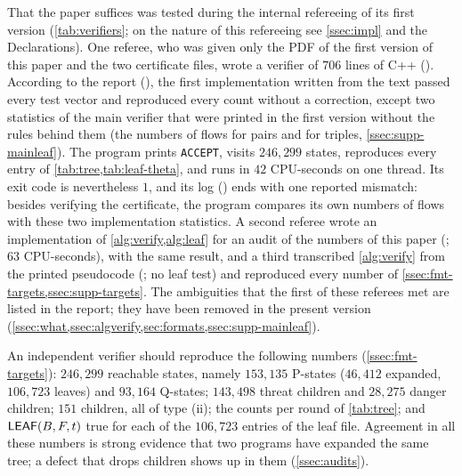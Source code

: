 That the paper suffices was tested during the internal refereeing of its first version
(\cref{tab:verifiers}; on the nature of this refereeing see \cref{ssec:impl} and the Declarations). One
referee, who was
given only the PDF of the first version of this paper and the two certificate files, wrote a verifier of
$706$ lines of C++ (). According to the report
(), the first implementation written from the text passed every
test vector and reproduced every count without a correction, except two statistics of the main verifier
that were printed in the first version without the rules behind them (the numbers of flows for pairs and
for triples, \cref{ssec:supp-mainleaf}). The program prints \texttt{ACCEPT}, visits $246{,}299$ states,
reproduces every entry of \cref{tab:tree,tab:leaf-theta}, and runs in $42$ CPU-seconds on one thread.
Its exit code is nevertheless $1$, and its log () ends with
one reported mismatch: besides verifying the certificate, the program compares its own numbers of flows
with these two implementation statistics. A second referee wrote an implementation of \cref{alg:verify,alg:leaf} for an
audit of the numbers of this paper (; $63$ CPU-seconds), with
the same result, and a third transcribed \cref{alg:verify} from the printed pseudocode
(; no leaf test) and reproduced every number of
\cref{ssec:fmt-targets,ssec:supp-targets}. The ambiguities that the first of these referees met are listed in the report;
they have been removed in the present version
(\cref{ssec:what,ssec:algverify,sec:formats,ssec:supp-mainleaf}).

An independent verifier should reproduce the following numbers (\cref{ssec:fmt-targets}): $246{,}299$
reachable states, namely $153{,}135$ P-states ($46{,}412$ expanded, $106{,}723$ leaves) and $93{,}164$
Q-states; $143{,}498$ threat children and $28{,}275$ danger children; $151$ \VOID{} children, all of type
(ii); the counts per round of \cref{tab:tree}; and $\mathsf{LEAF}(B,F,t)$ true for each of the $106{,}723$ entries of
the leaf file. Agreement in all these numbers is strong evidence that two programs have expanded the
same tree; a defect that drops children shows up in them (\cref{ssec:audits}).

